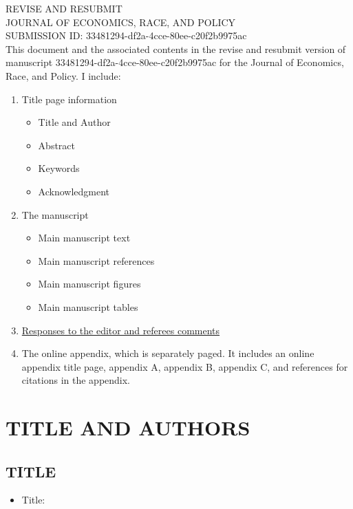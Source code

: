 \documentclass[12pt,english]{article}
\begin{document}
\thispagestyle{empty}
\begingroup
  \doublespacing
  \centering
  \LARGE REVISE AND RESUBMIT\\[0.25em]
  \LARGE JOURNAL OF ECONOMICS, RACE, AND POLICY \\[0.25em]
  \LARGE SUBMISSION ID: 33481294-df2a-4cce-80ee-c20f2b9975ac \\[1.0em]
\endgroup
This document and the associated contents in the revise and resubmit version of manuscript 33481294-df2a-4cce-80ee-c20f2b9975ac for the Journal of Economics, Race, and Policy. I include:
\begin{enumerate}
    \item Title page information
    \begin{itemize}
        \item Title and Author
        \item Abstract
        \item Keywords
        \item Acknowledgment
    \end{itemize}
    \item The manuscript
    \begin{itemize}
        \item Main manuscript text
        \item Main manuscript references
        \item Main manuscript figures
        \item Main manuscript tables
    \end{itemize}  
    \item \hyperref[r&r:responses]{Responses to the editor and referees comments}
    \item The online appendix, which is separately paged. It includes an online appendix title page, appendix A, appendix B, appendix C, and references for citations in the appendix.
\end{enumerate}
\clearpage


\setcounter{page}{1}

\section*{TITLE AND AUTHORS}
\subsection*{TITLE}
\begin{itemize}[label={}, leftmargin=*]
    \item Title: \textbf{\PAPERTITLE}
\end{itemize}
\end{document}

